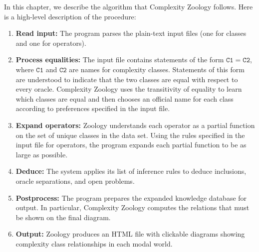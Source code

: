 In this chapter, we describe the algorithm that Complexity Zoology follows. Here is a high-level description of the procedure:
\begin{enumerate}
    \item \textbf{Read input:} The program parses the plain-text input files (one  
      for classes and one for operators).
    \item \textbf{Process equalities:} The input file contains statements of the 
      form $\mathtt{C1=C2}$, where $\mathtt{C1}$ and $\mathtt{C2}$ are names for 
      complexity classes. Statements of this form are understood to indicate that 
      the two classes are equal with respect to every oracle. Complexity Zoology 
      uses the transitivity of equality to learn which classes are equal and then 
      chooses an official name for each class according to preferences specified in 
      the input file.
    \item \textbf{Expand operators:} Zoology understands each operator as a partial 
      function on the set of unique classes in the data set. Using the rules 
      specified in the input file for operators, the program expands each partial 
      function to be as large as possible.
    \item \textbf{Deduce:} The system applies its list of inference rules to deduce 
      inclusions, oracle separations, and open problems.
    \item \textbf{Postprocess:} The program prepares the expanded knowledge database
      for output. In particular, Complexity Zoology computes the relations that must
      be shown on the final diagram.
    \item \textbf{Output:} Zoology produces an HTML file with clickable diagrams 
      showing complexity class relationships in each modal world.
\end{enumerate}
